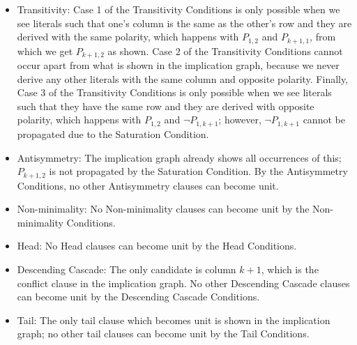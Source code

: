 \documentclass[10pt,a4paper]{article}
\begin{document}
\begin{itemize}
    \item Transitivity:  Case 1 of the Transitivity Conditions is only possible when we see literals such that one's column is the same as the other's row and they are derived with the same polarity, which happens with $P_{1, 2}$ and $P_{k + 1, 1}$, from which we get $P_{k + 1, 2}$ as shown. Case 2 of the Transitivity Conditions cannot occur apart from what is shown in the implication graph, because we never derive any other literals with the same column and opposite polarity. Finally, Case 3 of the Transitivity Conditions is only possible when we see literals such that they have the same row and they are derived with opposite polarity, which happens with $P_{1, 2}$ and $\neg P_{1, k + 1}$; however, $\neg P_{1, k + 1}$ cannot be propagated due to the Saturation Condition.
    \item Antisymmetry: The implication graph already shows all occurrences of this; $P_{k + 1, 2}$ is not propagated by the Saturation Condition. By the Antisymmetry Conditions, no other Antisymmetry clauses can become unit. 
    \item Non-minimality: No Non-minimality clauses can become unit by the Non-minimality Conditions. 
    \item Head: No Head clauses can become unit by the Head Conditions. 
    \item Descending Cascade: The only candidate is column $k + 1$, which is the conflict clause in the implication graph. No other Descending Cascade clauses can become unit by the Descending Cascade Conditions. 
    \item Tail: The only tail clause which becomes unit is shown in the implication graph; no other tail clauses can become unit by the Tail Conditions. 
\end{itemize}




\end{document}
